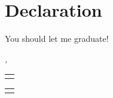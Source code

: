 \chapter*{Declaration}
\thispagestyle{empty}
You should let me graduate!
\bigskip

\noindent\textit{\myLocation, \myTime}

\smallskip

\begin{flushright}
    \begin{tabular}{m{5cm}}
        \\ \hline
        \centering\spacedlowsmallcaps{\myName} \\
    \end{tabular}

    \bigskip

    \begin{tabular}{m{5cm}}
        \\ \hline
        \centering\spacedlowsmallcaps{\myProf} \\
    \end{tabular}
\end{flushright}
